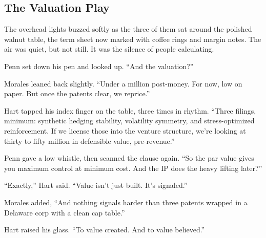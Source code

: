 \subsection{The Valuation Play}

The overhead lights buzzed softly as the three of them sat around the polished walnut table, the term sheet now 
marked with coffee rings and margin notes. The air was quiet, but not still. It was the silence of people calculating.

Penn set down his pen and looked up. ``And the valuation?''

Morales leaned back slightly. ``Under a million post-money. For now, low on paper. But once the patents clear, we reprice.''

Hart tapped his index finger on the table, three times in rhythm. ``Three filings, minimum: synthetic hedging stability, 
volatility symmetry, and stress-optimized reinforcement. If we license those into the venture structure, we’re looking at 
thirty to fifty million in defensible value, pre-revenue.''

Penn gave a low whistle, then scanned the clause again. ``So the par value gives you maximum control at minimum cost. And 
the IP does the heavy lifting later?''

``Exactly,'' Hart said. ``Value isn’t just built. It’s signaled.''

Morales added, ``And nothing signals harder than three patents wrapped in a Delaware corp with a clean cap table.''

Hart raised his glass. ``To value created. And to value believed.''

\medskip

